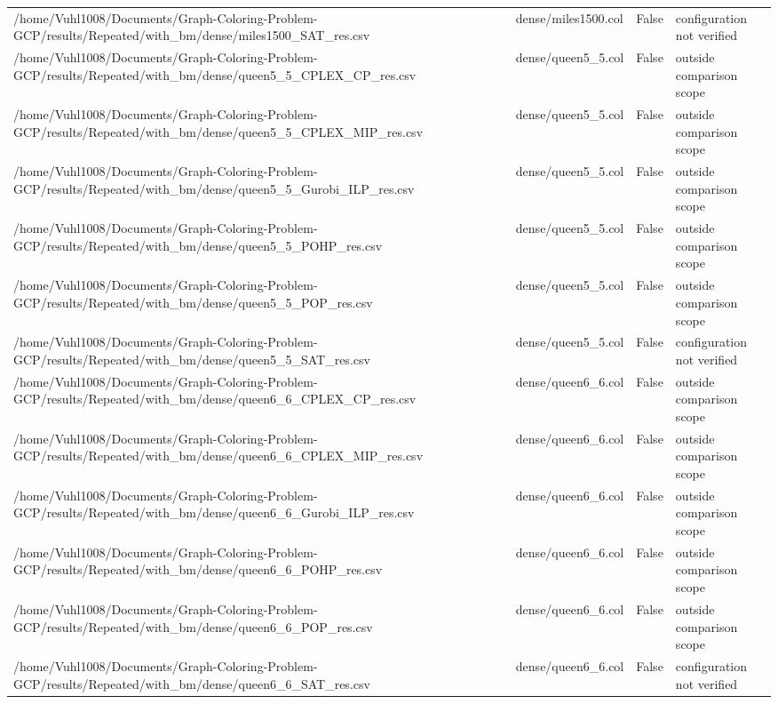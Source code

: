 \begin{table}[htbp]
\begin{tabular}{llll}
/home/Vuhl1008/Documents/Graph-Coloring-Problem-GCP/results/Repeated/with\_bm/dense/miles1500\_SAT\_res.csv & dense/miles1500.col & False & configuration not verified \\
/home/Vuhl1008/Documents/Graph-Coloring-Problem-GCP/results/Repeated/with\_bm/dense/queen5\_5\_CPLEX\_CP\_res.csv & dense/queen5\_5.col & False & outside comparison scope \\
/home/Vuhl1008/Documents/Graph-Coloring-Problem-GCP/results/Repeated/with\_bm/dense/queen5\_5\_CPLEX\_MIP\_res.csv & dense/queen5\_5.col & False & outside comparison scope \\
/home/Vuhl1008/Documents/Graph-Coloring-Problem-GCP/results/Repeated/with\_bm/dense/queen5\_5\_Gurobi\_ILP\_res.csv & dense/queen5\_5.col & False & outside comparison scope \\
/home/Vuhl1008/Documents/Graph-Coloring-Problem-GCP/results/Repeated/with\_bm/dense/queen5\_5\_POHP\_res.csv & dense/queen5\_5.col & False & outside comparison scope \\
/home/Vuhl1008/Documents/Graph-Coloring-Problem-GCP/results/Repeated/with\_bm/dense/queen5\_5\_POP\_res.csv & dense/queen5\_5.col & False & outside comparison scope \\
/home/Vuhl1008/Documents/Graph-Coloring-Problem-GCP/results/Repeated/with\_bm/dense/queen5\_5\_SAT\_res.csv & dense/queen5\_5.col & False & configuration not verified \\
/home/Vuhl1008/Documents/Graph-Coloring-Problem-GCP/results/Repeated/with\_bm/dense/queen6\_6\_CPLEX\_CP\_res.csv & dense/queen6\_6.col & False & outside comparison scope \\
/home/Vuhl1008/Documents/Graph-Coloring-Problem-GCP/results/Repeated/with\_bm/dense/queen6\_6\_CPLEX\_MIP\_res.csv & dense/queen6\_6.col & False & outside comparison scope \\
/home/Vuhl1008/Documents/Graph-Coloring-Problem-GCP/results/Repeated/with\_bm/dense/queen6\_6\_Gurobi\_ILP\_res.csv & dense/queen6\_6.col & False & outside comparison scope \\
/home/Vuhl1008/Documents/Graph-Coloring-Problem-GCP/results/Repeated/with\_bm/dense/queen6\_6\_POHP\_res.csv & dense/queen6\_6.col & False & outside comparison scope \\
/home/Vuhl1008/Documents/Graph-Coloring-Problem-GCP/results/Repeated/with\_bm/dense/queen6\_6\_POP\_res.csv & dense/queen6\_6.col & False & outside comparison scope \\
/home/Vuhl1008/Documents/Graph-Coloring-Problem-GCP/results/Repeated/with\_bm/dense/queen6\_6\_SAT\_res.csv & dense/queen6\_6.col & False & configuration not verified \\
\hline
\end{tabular}
\end{table}
